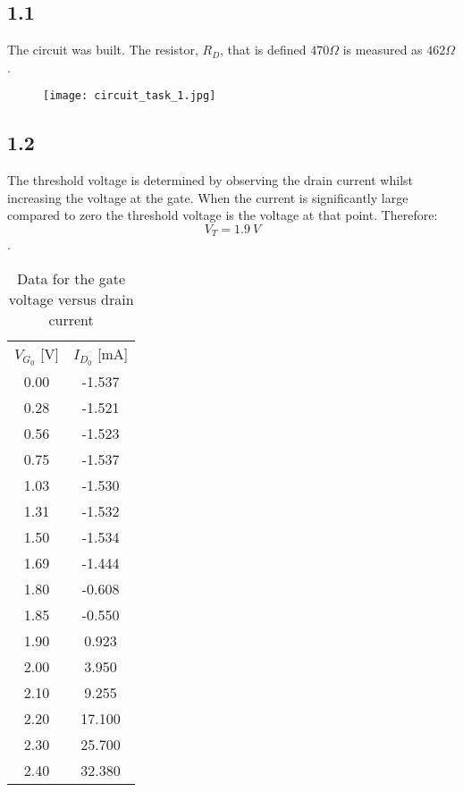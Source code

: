 \subsection*{1.1}
The circuit was built. The resistor, $R_D$, that is defined $470 \Omega$  is measured as $462 \Omega$.

    \begin{figure}[h!]
        \centering
        \texttt{[image: circuit\_task\_1.jpg]}
    \end{figure}

\subsection*{1.2}
The threshold voltage is determined by observing the drain current whilst increasing the voltage at the gate. When the current is significantly large compared to zero the threshold voltage is the voltage at that point. Therefore: $$V_T = 1.9 \ V$$.

   \begin{table}[htbp]
     \centering
     \caption{Data for the gate voltage versus drain current}
       \begin{tabular}{cc}
       $V_{G_0}$ [V]       & $I_{D_0}$ [mA] \\
       0.00         & -1.537 \\
       0.28         & -1.521 \\
       0.56         & -1.523 \\
       0.75         & -1.537 \\
       1.03         & -1.530 \\
       1.31         & -1.532 \\
       1.50         & -1.534 \\
       1.69         & -1.444 \\
       1.80         & -0.608 \\
       1.85         & -0.550 \\
       1.90         & 0.923 \\
       2.00         & 3.950 \\
       2.10         & 9.255 \\
       2.20         & 17.100 \\
       2.30         & 25.700 \\
       2.40         & 32.380 \\
       \end{tabular}%
     \label{tab:addlabel}%
   \end{table}%


